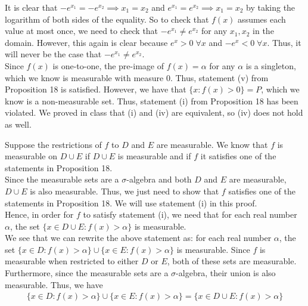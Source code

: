 \documentclass[12pt]{article}
\newenvironment{problem}[2][Problem]{\begin{trivlist}
\item[\hskip \labelsep {\bfseries #1}\hskip \labelsep {\bfseries #2.}]}{\end{trivlist}}
\begin{document}
It is clear that $-e^{x_1} = -e^{x_2} \implies x_1 = x_2$ and $e^{x_1} = e^{x_2} \implies x_1 = x_2$ by taking the logarithm of both sides of the equality. So to check that $f(x)$ assumes each value at most once, we need to check that $-e^{x_1} \neq e^{x_2}$ for any $x_1, x_2$ in the domain. However, this again is clear because $e^x > 0 \; \forall x$ and $-e^x < 0 \; \forall x$. Thus, it will never be the case that $-e^{x_1} \neq e^{x_2}$.\\

Since $f(x)$ is one-to-one, the pre-image of $f(x) = \alpha$ for any $\alpha$ is a singleton, which we know is measurable with measure 0. Thus, statement (v) from Proposition 18 is satisfied. However, we have that $\{x: f(x) > 0\} = P$, which we know is a non-measurable set. Thus, statement (i) from Proposition 18 has been violated. We proved in class that (i) and (iv) are equivalent, so (iv) does not hold as well.

\begin{problem}{3}
\end{problem}

Suppose the restrictions of $f$ to $D$ and $E$ are measurable. We know that $f$ is measurable on $D \cup E$ if $D \cup E$ is measurable and if $f$ it satisfies one of the statements in Proposition 18.\\

Since the measurable sets are a $\sigma$-algebra and both $D$ and $E$ are measurable, $D \cup E$ is also measurable. Thus, we just need to show that $f$ satisfies one of the statements in Proposition 18. We will use statement (i) in this proof.\\

Hence, in order for $f$ to satisfy statement (i), we need that for each real number $\alpha$, the set $\{x \in D \cup E: f(x) > \alpha\}$ is measurable.\\

We see that we can rewrite the above statement as: for each real number $\alpha$, the set $\{x \in D: f(x) > \alpha\} \cup \{x \in E: f(x) > \alpha\}$ is measurable. Since $f$ is measurable when restricted to either $D$ or $E$, both of these sets are measurable. Furthermore, since the measurable sets are a $\sigma$-algebra, their union is also measurable. Thus, we have
\begin{align*}
\{x \in D: f(x) > \alpha\} \cup \{x \in E: f(x) > \alpha\} = \{x \in D \cup E: f(x) > \alpha\}
\end{align*}
\end{document}
